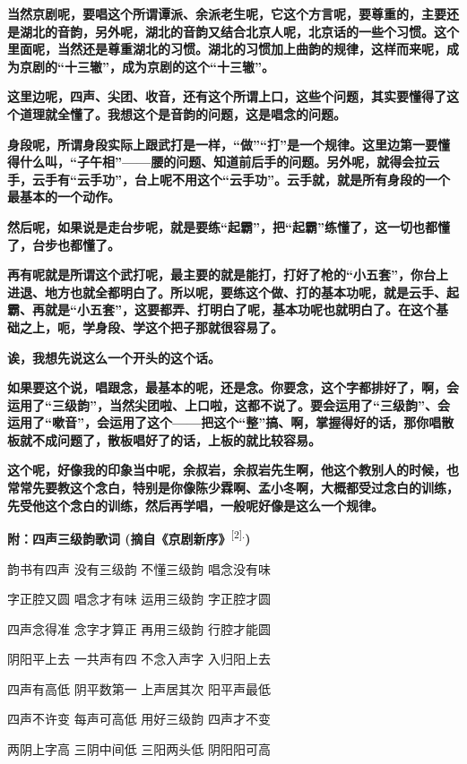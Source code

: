 \textbf{当然京剧呢，要唱这个所谓谭派、余派老生呢，它这个方言呢，要尊重的，主要还是湖北的音韵，另外呢，湖北的音韵又结合北京人呢，北京话的一些个习惯。这个里面呢，当然还是尊重湖北的习惯。湖北的习惯加上曲韵的规律，这样而来呢，成为京剧的``十三辙''，成为京剧的这个``十三辙''。}

\textbf{这里边呢，四声、尖团、收音，还有这个所谓上口，这些个问题，其实要懂得了这个道理就全懂了。我想这个是音韵的问题，这是唱念的问题。}

\textbf{身段呢，所谓身段实际上跟武打是一样，``做''``打''是一个规律。这里边第一要懂得什么叫，``子午相''------腰的问题、知道前后手的问题。另外呢，就得会拉云手，云手有``云手功''，台上呢不用这个``云手功''。云手就，就是所有身段的一个最基本的一个动作。}

\textbf{然后呢，如果说是走台步呢，就是要练``起霸''，把``起霸''练懂了，这一切也都懂了，台步也都懂了。}

\textbf{再有呢就是所谓这个武打呢，最主要的就是能打，打好了枪的``小五套''，你台上进退、地方也就全都明白了。所以呢，要练这个做、打的基本功呢，就是云手、起霸、再就是``小五套''，这要都弄、打明白了呢，基本功呢也就明白了。在这个基础之上，呃，学身段、学这个把子那就很容易了。}

\textbf{诶，我想先说这么一个开头的这个话。}

\textbf{如果要这个说，唱跟念，最基本的呢，还是念。你要念，这个字都排好了，啊，会运用了``三级韵''，当然尖团啦、上口啦，这都不说了。要会运用了``三级韵''、会运用了``嗽音''，会运用了这个------把这个``整''搞、啊，掌握得好的话，那你唱散板就不成问题了，散板唱好了的话，上板的就比较容易。}

\textbf{这个呢，好像我的印象当中呢，余叔岩，余叔岩先生啊，他这个教别人的时候，也常常先要教这个念白，特别是你像陈少霖啊、孟小冬啊，大概都受过念白的训练，先受他这个念白的训练，然后再学唱，一般呢好像是这么一个规律。}

\textbf{附：四声三级韵歌词
(摘自《京剧新序》}\textsuperscript{{[}2{]}.}\textbf{)}

韵书有四声 没有三级韵 不懂三级韵 唱念没有味

字正腔又圆 唱念才有味 运用三级韵 字正腔才圆

四声念得准 念字才算正 再用三级韵 行腔才能圆

阴阳平上去 一共声有四 不念入声字 入归阳上去

四声有高低 阴平数第一 上声居其次 阳平声最低

四声不许变 每声可高低 用好三级韵 四声才不变

两阴上字高 三阴中间低 三阳两头低 阴阳阳可高

